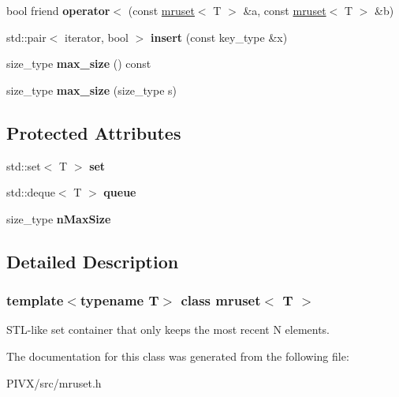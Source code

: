 \begin{DoxyCompactItemize}
\mbox{\label{classmruset_a5a95239f76da8ba675ba748baf1f07c8}} 
bool friend {\bfseries operator$<$} (const \mbox{\hyperlink{classmruset}{mruset}}$<$ T $>$ \&a, const \mbox{\hyperlink{classmruset}{mruset}}$<$ T $>$ \&b)
\item 
\mbox{\label{classmruset_af2e0dfe9d8b029bde78457797cdc42a9}} 
std\+::pair$<$ iterator, bool $>$ {\bfseries insert} (const key\+\_\+type \&x)
\item 
\mbox{\label{classmruset_af33f9531e47639e4dc6a42c123797292}} 
size\+\_\+type {\bfseries max\+\_\+size} () const
\item 
\mbox{\label{classmruset_a030aa4599dfb54074183e2cdfbe2373f}} 
size\+\_\+type {\bfseries max\+\_\+size} (size\+\_\+type s)
\end{DoxyCompactItemize}
\subsection*{Protected Attributes}
\begin{DoxyCompactItemize}
\item 
\mbox{\label{classmruset_a4981fc3556b61600418b2ddad98cc685}} 
std\+::set$<$ T $>$ {\bfseries set}
\item 
\mbox{\label{classmruset_a6be1fe81dc472e25e160911288373663}} 
std\+::deque$<$ T $>$ {\bfseries queue}
\item 
\mbox{\label{classmruset_a6d3d6963e3ca5689e846b12a29dd09ab}} 
size\+\_\+type {\bfseries n\+Max\+Size}
\end{DoxyCompactItemize}


\subsection{Detailed Description}
\subsubsection*{template$<$typename T$>$\newline
class mruset$<$ T $>$}

S\+T\+L-\/like set container that only keeps the most recent N elements. 

The documentation for this class was generated from the following file\+:\begin{DoxyCompactItemize}
\item 
P\+I\+V\+X/src/mruset.\+h\end{DoxyCompactItemize}
